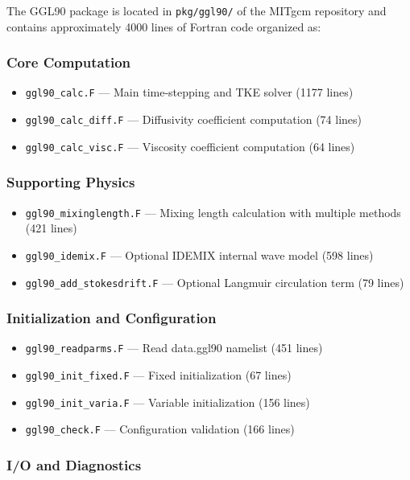 \documentclass[11pt, a4paper]{article}
\begin{document}
The GGL90 package is located in \texttt{pkg/ggl90/} of the MITgcm repository and contains approximately 4000 lines of Fortran code organized as:

\subsubsection{Core Computation}

\begin{itemize}
    \item \texttt{ggl90\_calc.F} — Main time-stepping and TKE solver (1177 lines)
    \item \texttt{ggl90\_calc\_diff.F} — Diffusivity coefficient computation (74 lines)
    \item \texttt{ggl90\_calc\_visc.F} — Viscosity coefficient computation (64 lines)
\end{itemize}

\subsubsection{Supporting Physics}

\begin{itemize}
    \item \texttt{ggl90\_mixinglength.F} — Mixing length calculation with multiple methods (421 lines)
    \item \texttt{ggl90\_idemix.F} — Optional IDEMIX internal wave model (598 lines)
    \item \texttt{ggl90\_add\_stokesdrift.F} — Optional Langmuir circulation term (79 lines)
\end{itemize}

\subsubsection{Initialization and Configuration}

\begin{itemize}
    \item \texttt{ggl90\_readparms.F} — Read data.ggl90 namelist (451 lines)
    \item \texttt{ggl90\_init\_fixed.F} — Fixed initialization (67 lines)
    \item \texttt{ggl90\_init\_varia.F} — Variable initialization (156 lines)
    \item \texttt{ggl90\_check.F} — Configuration validation (166 lines)
\end{itemize}

\subsubsection{I/O and Diagnostics}
\end{document}
